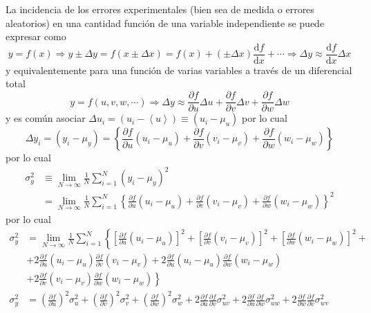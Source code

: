 \documentclass[spanish,titlepage,11pt]{article}
\begin{document}
La incidencia de los errores experimentales (bien sea de medida o errores
aleatorios) en una cantidad funci\'{o}n de una variable independiente se puede
expresar como
\[
y=f(x)\Rightarrow y\pm\Delta y=f\left(  x\pm\Delta x\right)  =f(x)+\left(
\pm\Delta x\right)  \frac{\mathrm{d}f}{\mathrm{d}x}+\cdots\Rightarrow\Delta
y\approx\frac{\mathrm{d}f}{\mathrm{d}x}\Delta x
\]
y equivalentemente para una funci\'{o}n de varias variables a trav\'{e}s de un
diferencial total
\[
y=f(u,v,w,\cdots)\Rightarrow\Delta y\approx\frac{\partial f}{\partial u}\Delta
u+\frac{\partial f}{\partial v}\Delta v+\frac{\partial f}{\partial w}\Delta w
\]
y es com\'{u}n asociar $\Delta u_{i}=\left(  u_{i}-\left\langle u\right\rangle
\right)  \equiv\left(  u_{i}-\mu_{u}\right)  $ por lo cual
\[
\Delta y_{i}=\left(  y_{i}-\mu_{y}\right)  =\left\{  \frac{\partial
f}{\partial u}\left(  u_{i}-\mu_{u}\right)  +\frac{\partial f}{\partial
v}\left(  v_{i}-\mu_{v}\right)  +\frac{\partial f}{\partial w}\left(
w_{i}-\mu_{w}\right)  \right\}
\]
por lo cual
\begin{align*}
\sigma_{y}^{2}  &  \equiv\lim_{N\rightarrow\infty}\frac{1}{N}\sum_{i=1}%
^{N}\left(  y_{i}-\mu_{y}\right)  ^{2}\\
&  =\lim_{N\rightarrow\infty}\frac{1}{N}\sum_{i=1}^{N}\left\{  \frac{\partial
f}{\partial u}\left(  u_{i}-\mu_{u}\right)  +\frac{\partial f}{\partial
v}\left(  v_{i}-\mu_{v}\right)  +\frac{\partial f}{\partial w}\left(
w_{i}-\mu_{w}\right)  \right\}  ^{2}%
\end{align*}
por lo cual
\begin{align*}
\sigma_{y}^{2}  &  =\lim_{N\rightarrow\infty}\frac{1}{N}\sum_{i=1}^{N}\left\{
\left[  \frac{\partial f}{\partial u}\left(  u_{i}-\mu_{u}\right)  \right]
^{2}+\left[  \frac{\partial f}{\partial v}\left(  v_{i}-\mu_{v}\right)
\right]  ^{2}+\left[  \frac{\partial f}{\partial w}\left(  w_{i}-\mu
_{w}\right)  \right]  ^{2}+\right. \\
&  +2\frac{\partial f}{\partial u}\left(  u_{i}-\mu_{u}\right)  \frac{\partial
f}{\partial v}\left(  v_{i}-\mu_{v}\right)  +2\frac{\partial f}{\partial
u}\left(  u_{i}-\mu_{u}\right)  \frac{\partial f}{\partial w}\left(  w_{i}%
-\mu_{w}\right) \\
&  \left.  +2\frac{\partial f}{\partial v}\left(  v_{i}-\mu_{v}\right)
\frac{\partial f}{\partial w}\left(  w_{i}-\mu_{w}\right)  \right\} \\
\sigma_{y}^{2}  &  =\left(  \frac{\partial f}{\partial u}\right)  ^{2}%
\sigma_{u}^{2}+\left(  \frac{\partial f}{\partial v}\right)  ^{2}\sigma
_{v}^{2}+\left(  \frac{\partial f}{\partial w}\right)  ^{2}\sigma_{w}%
^{2}+2\frac{\partial f}{\partial u}\frac{\partial f}{\partial v}\sigma
_{uv}^{2}+2\frac{\partial f}{\partial u}\frac{\partial f}{\partial w}%
\sigma_{uw}^{2}+2\frac{\partial f}{\partial w}\frac{\partial f}{\partial
v}\sigma_{wv}^{2}%
\end{align*}
\end{document}
